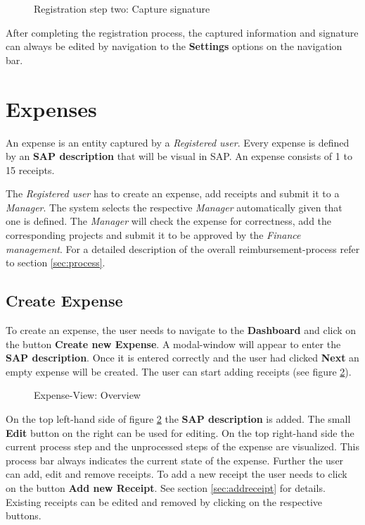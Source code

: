 \begin{figure}[H]
    \centering
    \caption{Registration step two: Capture signature}
    \label{fig:registration-step02}
\end{figure}

After completing the registration process, the captured information and signature can always be edited by navigation to the \textbf{Settings} options on the navigation bar.\newline

\section{Expenses}

An expense is an entity captured by a \textit{Registered user}. Every expense is defined by an \textbf{SAP description} that will be visual in SAP. An expense consists of 1 to 15 receipts.

The \textit{Registered user} has to create an expense, add receipts and submit it to a \textit{Manager}. The system selects the respective \textit{Manager} automatically given that one is defined. The \textit{Manager} will check the expense for correctness, add the corresponding projects and submit it to be approved by the \textit{Finance management}. For a detailed description of the overall reimbursement-process refer to section \ref{sec:process}.

\subsection{Create Expense}

To create an expense, the user needs to navigate to the \textbf{Dashboard} and click on the button \textbf{Create new Expense}. A modal-window will appear to enter the \textbf{SAP description}. Once it is entered correctly and the user had clicked \textbf{Next} an empty expense will be created. The user can start adding receipts (see figure \ref{fig:expensesitems-overview}).

\begin{figure}[H]
    \centering
    \caption{Expense-View: Overview}
    \label{fig:expensesitems-overview}
\end{figure}

On the top left-hand side of figure \ref{fig:expensesitems-overview} the \textbf{SAP description} is added. The small \textbf{Edit} button on the right can be used for editing. On the top right-hand side the current process step and the unprocessed steps of the expense are visualized. This process bar always indicates the current state of the expense.\newline
Further the user can add, edit and remove receipts. To add a new receipt the user needs to click on the button \textbf{Add new Receipt}. See section \ref{sec:addreceipt} for details. \newline
Existing receipts can be edited and removed by clicking on the respective buttons.


